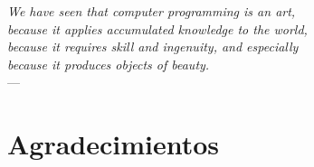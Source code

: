 
\begin{flushright}{\slshape
    We have seen that computer programming is an art, \\
    because it applies accumulated knowledge to the world, \\
    because it requires skill and ingenuity, and especially \\
    because it produces objects of beauty.} \\ \medskip
    ---  \citep{knuth:1974}
\end{flushright}



\bigskip

\begingroup
\let\clearpage\relax
\let\cleardoublepage\relax
\let\cleardoublepage\relax
\chapter*{Agradecimientos}


